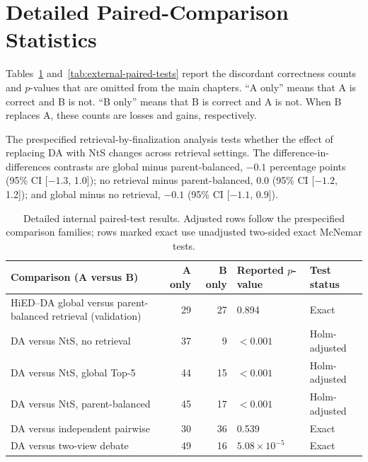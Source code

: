 \section{Detailed Paired-Comparison Statistics}

Tables~\ref{tab:internal-paired-tests} and~\ref{tab:external-paired-tests} report the discordant correctness counts and $p$-values that are omitted from the main chapters. ``A only'' means that A is correct and B is not. ``B only'' means that B is correct and A is not. When B replaces A, these counts are losses and gains, respectively.

\noindent\begin{minipage}{\textwidth}
The prespecified retrieval-by-finalization analysis tests whether the effect of replacing DA with NtS changes across retrieval settings. The difference-in-differences contrasts are global minus parent-balanced, $-0.1$ percentage points (95\% CI [$-1.3$, 1.0]); no retrieval minus parent-balanced, 0.0 (95\% CI [$-1.2$, 1.2]); and global minus no retrieval, $-0.1$ (95\% CI [$-1.1$, 0.9]).
\end{minipage}

\begin{table}[htbp]
\centering
\caption{Detailed internal paired-test results. Adjusted rows follow the prespecified comparison families; rows marked exact use unadjusted two-sided exact McNemar tests.}
\label{tab:internal-paired-tests}
\footnotesize
\renewcommand{\arraystretch}{1.08}
\begin{tabularx}{\textwidth}{|>{\raggedright\arraybackslash}X|r|r|p{2.7cm}|p{2.8cm}|}
\hline
Comparison (A versus B) & A only & B only & Reported $p$-value & Test status\\
\hline
HiED--DA global versus parent-balanced retrieval (validation) & 29 & 27 & 0.894 & Exact\\
\hline
DA versus NtS, no retrieval & 37 & 9 & $<0.001$ & Holm-adjusted\\
\hline
DA versus NtS, global Top-5 & 44 & 15 & $<0.001$ & Holm-adjusted\\
\hline
DA versus NtS, parent-balanced & 45 & 17 & $<0.001$ & Holm-adjusted\\
\hline
DA versus independent pairwise & 30 & 36 & 0.539 & Exact\\
\hline
DA versus two-view debate & 49 & 16 & $5.08\times10^{-5}$ & Exact\\
\hline
\end{tabularx}
\renewcommand{\arraystretch}{1.0}
\end{table}

